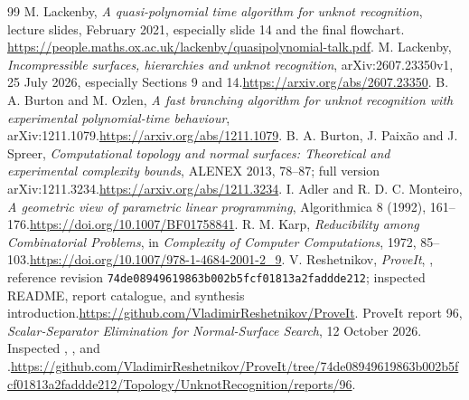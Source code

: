 \documentclass[11pt,a4paper]{article}
\theoremstyle{definition}
\theoremstyle{remark}
\newcommand{\pin}{\texttt{74de08949619863b002b5fcf01813a2faddde212}}
\begin{document}
\begin{thebibliography}{99}
 M. Lackenby, \emph{A quasi-polynomial time algorithm for unknot recognition}, lecture slides, February 2021, especially slide 14 and the final flowchart.\newline
\url{https://people.maths.ox.ac.uk/lackenby/quasipolynomial-talk.pdf}.
 M. Lackenby, \emph{Incompressible surfaces, hierarchies and unknot recognition}, arXiv:2607.23350v1, 25 July 2026, especially Sections 9 and 14.\newline \url{https://arxiv.org/abs/2607.23350}.
 B. A. Burton and M. Ozlen, \emph{A fast branching algorithm for unknot recognition with experimental polynomial-time behaviour}, arXiv:1211.1079.\newline \url{https://arxiv.org/abs/1211.1079}.
 B. A. Burton, J. Paix\~ao and J. Spreer, \emph{Computational topology and normal surfaces: Theoretical and experimental complexity bounds}, ALENEX 2013, 78--87; full version arXiv:1211.3234.\newline \url{https://arxiv.org/abs/1211.3234}.
 I. Adler and R. D. C. Monteiro, \emph{A geometric view of parametric linear programming}, Algorithmica 8 (1992), 161--176.\newline \url{https://doi.org/10.1007/BF01758841}.
 R. M. Karp, \emph{Reducibility among Combinatorial Problems}, in \emph{Complexity of Computer Computations}, 1972, 85--103.\newline \url{https://doi.org/10.1007/978-1-4684-2001-2_9}.
 V. Reshetnikov, \emph{ProveIt}, , reference revision \pin; inspected README, report catalogue, and synthesis introduction.\newline \url{https://github.com/VladimirReshetnikov/ProveIt}.
 ProveIt report 96, \emph{Scalar-Separator Elimination for Normal-Surface Search}, 12 October 2026. Inspected , , and .\newline \url{https://github.com/VladimirReshetnikov/ProveIt/tree/74de08949619863b002b5fcf01813a2faddde212/Topology/UnknotRecognition/reports/96}.
\end{thebibliography}
\end{document}
